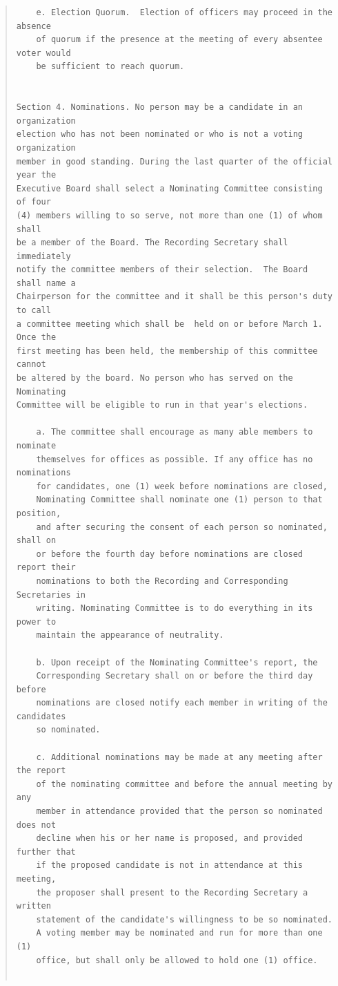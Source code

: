 \documentclass{article}
\begin{document}
\begin{quote}
\begin{verbatim}
    e. Election Quorum.  Election of officers may proceed in the absence
    of quorum if the presence at the meeting of every absentee voter would
    be sufficient to reach quorum.


Section 4. Nominations. No person may be a candidate in an organization
election who has not been nominated or who is not a voting organization
member in good standing. During the last quarter of the official year the
Executive Board shall select a Nominating Committee consisting of four
(4) members willing to so serve, not more than one (1) of whom shall
be a member of the Board. The Recording Secretary shall immediately
notify the committee members of their selection.  The Board shall name a
Chairperson for the committee and it shall be this person's duty to call
a committee meeting which shall be  held on or before March 1. Once the
first meeting has been held, the membership of this committee cannot
be altered by the board. No person who has served on the Nominating
Committee will be eligible to run in that year's elections.

    a. The committee shall encourage as many able members to nominate
    themselves for offices as possible. If any office has no nominations
    for candidates, one (1) week before nominations are closed,
    Nominating Committee shall nominate one (1) person to that position,
    and after securing the consent of each person so nominated, shall on
    or before the fourth day before nominations are closed report their
    nominations to both the Recording and Corresponding Secretaries in
    writing. Nominating Committee is to do everything in its power to
    maintain the appearance of neutrality.

    b. Upon receipt of the Nominating Committee's report, the
    Corresponding Secretary shall on or before the third day before
    nominations are closed notify each member in writing of the candidates
    so nominated.

    c. Additional nominations may be made at any meeting after the report
    of the nominating committee and before the annual meeting by any
    member in attendance provided that the person so nominated does not
    decline when his or her name is proposed, and provided further that
    if the proposed candidate is not in attendance at this meeting,
    the proposer shall present to the Recording Secretary a written
    statement of the candidate's willingness to be so nominated.
    A voting member may be nominated and run for more than one (1)
    office, but shall only be allowed to hold one (1) office.


\end{verbatim}
\end{quote}
\end{document}
